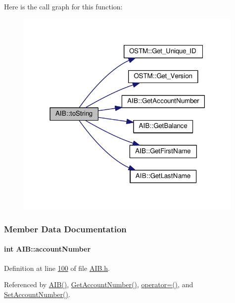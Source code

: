 Here is the call graph for this function\+:\nopagebreak
\begin{figure}[H]
\begin{center}
\leavevmode
\includegraphics[width=314pt]{class_a_i_b_aff0f0a0db75a17efec4bd500b888232d_aff0f0a0db75a17efec4bd500b888232d_cgraph}
\end{center}
\end{figure}




\subsubsection{Member Data Documentation}
\paragraph[{\texorpdfstring{account\+Number}{accountNumber}}]{\setlength{\rightskip}{0pt plus 5cm}int A\+I\+B\+::account\+Number\hspace{0.3cm}{\ttfamily [private]}}\hypertarget{class_a_i_b_aafc08efeec5b8c800c32ee32f20603a7_aafc08efeec5b8c800c32ee32f20603a7}{}\label{class_a_i_b_aafc08efeec5b8c800c32ee32f20603a7_aafc08efeec5b8c800c32ee32f20603a7}


Definition at line \hyperlink{_a_i_b_8h_source_l00100}{100} of file \hyperlink{_a_i_b_8h_source}{A\+I\+B.\+h}.



Referenced by \hyperlink{_a_i_b_8h_source_l00023}{A\+I\+B()}, \hyperlink{_a_i_b_8cpp_source_l00081}{Get\+Account\+Number()}, \hyperlink{_a_i_b_8h_source_l00066}{operator=()}, and \hyperlink{_a_i_b_8cpp_source_l00077}{Set\+Account\+Number()}.

